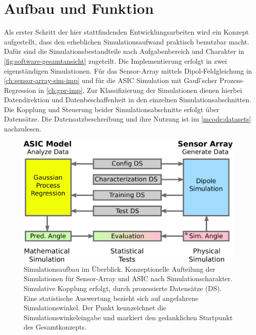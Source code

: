 %


\section{Aufbau und Funktion}\label{sec:aufbau-und-funktion}


Als erster Schritt der hier stattfindenden Entwicklungsarbeiten wird ein Konzept aufgestellt, dass den erheblichen Simulationsaufwand praktisch benutzbar macht. Dafür sind die Simulationsbestandteile nach Aufgabenbereich und Charakter in \autoref{fig:software-gesamtansicht} zugeteilt. Die Implementierung erfolgt in zwei eigenständigen Simulationen. Für das Sensor-Array mittels Dipol-Feldgleichung in \autoref{ch:sensor-array-sim-imp} und für die ASIC Simulation mit Gauß'scher Prozess-Regression in \autoref{ch:gpr-imp}. Zur Klassifizierung der Simulationen dienen hierbei Datendirektion und Datenbeschaffenheit in den einzelnen Simulationsabschnitten. Die Kopplung und Steuerung beider Simulationsabschnitte erfolgt über Datensätze. Die Datensatzbeschreibung und ihre Nutzung ist im \autoref{mcode:datasets} nachzulesen. 


\clearpage


\begin{figure}[htp]
	\centering
	\includegraphics[width=0.8\linewidth]{chapters/images/3-SW-E-OExp/Software-Gesamtansicht}
	\caption[Simulationsaufbau im Überblick]{Simulationsaufbau im Überblick. Konzeptionelle Aufteilung der Simulationen für Sensor-Array und ASIC nach Simulationscharakter. Simulative Kopplung erfolgt, durch prozessierte Datensätze (DS). Eine statistische Auswertung bezieht sich auf angefahrene Simulationswinkel. Der Punkt kennzeichnet die Simulationswinkeleingabe und markiert den gedanklichen Startpunkt des Gesamtkonzepts.}
	\label{fig:software-gesamtansicht}
\end{figure}


